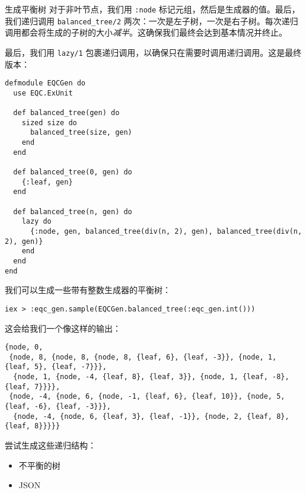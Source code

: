 \begin{example}{生成平衡树}
对于非叶节点，我们用 \texttt{:node}
标记元组，然后是生成器的值。最后，我们递归调用
\texttt{balanced\_tree/2}
两次：一次是左子树，一次是右子树。每次递归调用都会将生成的子树的大小\emph{减半}。这确保我们最终会达到基本情况并终止。

最后，我们用 \texttt{lazy/1}
包裹递归调用，以确保只在需要时调用递归调用。这是最终版本：

\begin{code}{}
\begin{verbatim}
defmodule EQCGen do
  use EQC.ExUnit

  def balanced_tree(gen) do
    sized size do
      balanced_tree(size, gen)
    end
  end

  def balanced_tree(0, gen) do
    {:leaf, gen}
  end

  def balanced_tree(n, gen) do
    lazy do
      {:node, gen, balanced_tree(div(n, 2), gen), balanced_tree(div(n, 2), gen)}
    end
  end
end
\end{verbatim}
\end{code}

我们可以生成一些带有整数生成器的平衡树：

\begin{code}{}
\begin{verbatim}
iex > :eqc_gen.sample(EQCGen.balanced_tree(:eqc_gen.int()))
\end{verbatim}
\end{code}

这会给我们一个像这样的输出：

\begin{code}{}
\begin{verbatim}
{node, 0,
 {node, 8, {node, 8, {node, 8, {leaf, 6}, {leaf, -3}}, {node, 1, {leaf, 5}, {leaf, -7}}},
  {node, 1, {node, -4, {leaf, 8}, {leaf, 3}}, {node, 1, {leaf, -8}, {leaf, 7}}}},
 {node, -4, {node, 6, {node, -1, {leaf, 6}, {leaf, 10}}, {node, 5, {leaf, -6}, {leaf, -3}}},
  {node, -4, {node, 6, {leaf, 3}, {leaf, -1}}, {node, 2, {leaf, 8}, {leaf, 8}}}}}
\end{verbatim}
\end{code}

尝试生成这些递归结构：

\begin{itemize}

\item  不平衡的树
\item  JSON
\end{itemize}

\end{example}

